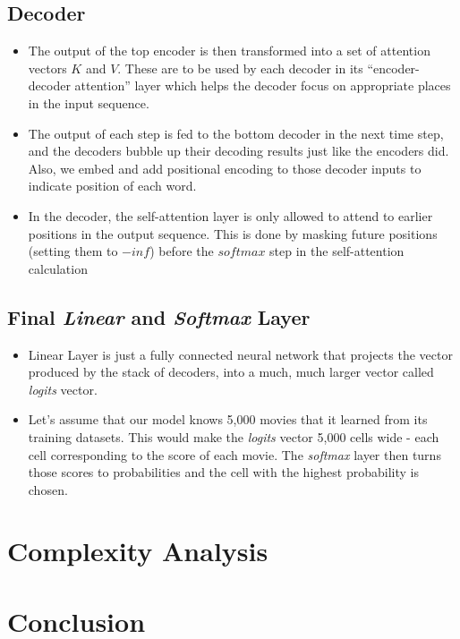 \documentclass[11pt]{article}
\begin{document}
\subsection{Decoder}
\begin{itemize}
\item The output of the top encoder is then transformed into a set of attention vectors $K$ and $V$. These are to be used by each decoder in its “encoder-decoder attention” layer which helps the decoder focus on appropriate places in the input sequence.
\item The output of each step is fed to the bottom decoder in the next time step, and the decoders bubble up their decoding results just like the encoders did. Also, we embed and add positional encoding to those decoder inputs to indicate position of each word.
\item In the decoder, the self-attention layer is only allowed to attend to earlier positions in the output sequence. This is done by masking future positions (setting them to $-inf$) before the $softmax$ step in the self-attention calculation
\end{itemize}

\subsection{Final \emph{Linear} and \emph{Softmax} Layer}
\begin{itemize}
\item Linear Layer is just a fully connected neural network that projects the vector produced by the stack of decoders, into a much, much larger vector called \textit{logits} vector.
\item 	Let’s assume that our model knows 5,000 movies that it learned from its training datasets. This would make the \textit{logits} vector 5,000 cells wide - each cell corresponding to the score of each movie. The \textit{softmax} layer then turns those scores to probabilities and the cell with the highest probability is chosen.

\end{itemize}

\section{Complexity Analysis}
\section{Conclusion}
\end{document}
